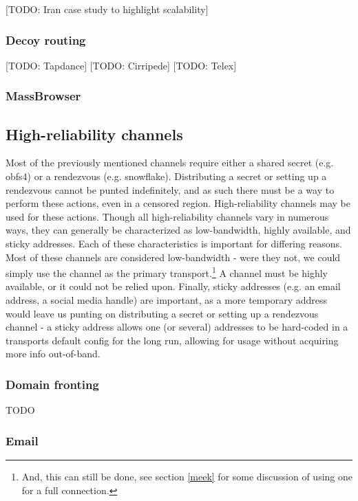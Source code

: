 \documentclass[12pt]{report}
\begin{document}
[TODO: Iran case study to highlight scalability]

\subsubsection{Decoy routing}

[TODO: Tapdance] [TODO: Cirripede] [TODO: Telex]

\subsubsection{MassBrowser}

\subsection{High-reliability channels}

Most of the previously mentioned channels require either a shared secret (e.g. obfs4) or a rendezvous (e.g. snowflake). Distributing a secret or setting up a rendezvous cannot be punted indefinitely, and as such there must be a way to perform these actions, even in a censored region. High-reliability channels may be used for these actions. Though all high-reliability channels vary in numerous ways, they can generally be characterized as low-bandwidth, highly available, and sticky addresses. Each of these characteristics is important for differing reasons. Most of these channels are considered low-bandwidth - were they not, we could simply use the channel as the primary transport.\footnote{And, this can still be done, see section \ref{meek} for some discussion of using one for a full connection.} A channel must be highly available, or it could not be relied upon. Finally, sticky addresses (e.g. an email address, a social media handle) are important, as a more temporary address would leave us punting on distributing a secret or setting up a rendezvous channel - a sticky address allows one (or several) addresses to be hard-coded in a transports default config for the long run, allowing for usage without acquiring more info out-of-band.

\subsubsection{Domain fronting}
\label{domain fronting}

TODO

\subsubsection{Email}
\end{document}
